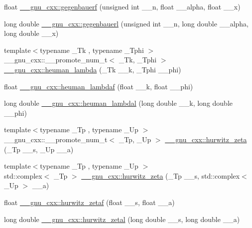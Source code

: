 \begin{DoxyCompactItemize}
\item 
float \hyperlink{group__gnu__math__spec__func_ga0f16dd9c771c8c177f377381b6e3387c}{\+\_\+\+\_\+gnu\+\_\+cxx\+::gegenbauerf} (unsigned int \+\_\+\+\_\+n, float \+\_\+\+\_\+alpha, float \+\_\+\+\_\+x)
\item 
long double \hyperlink{group__gnu__math__spec__func_gabf1644841deefbb162ade9fa508591cb}{\+\_\+\+\_\+gnu\+\_\+cxx\+::gegenbauerl} (unsigned int \+\_\+\+\_\+n, long double \+\_\+\+\_\+alpha, long double \+\_\+\+\_\+x)
\item 
{\footnotesize template$<$typename \+\_\+\+Tk , typename \+\_\+\+Tphi $>$ }\\\+\_\+\+\_\+gnu\+\_\+cxx\+::\+\_\+\+\_\+promote\+\_\+num\+\_\+t$<$ \+\_\+\+Tk, \+\_\+\+Tphi $>$ \hyperlink{group__gnu__math__spec__func_ga3b606d8617459ef7e5d340db1bae13ec}{\+\_\+\+\_\+gnu\+\_\+cxx\+::heuman\+\_\+lambda} (\+\_\+\+Tk \+\_\+\+\_\+k, \+\_\+\+Tphi \+\_\+\+\_\+phi)
\item 
float \hyperlink{group__gnu__math__spec__func_ga10cf5d54d985aa3a58cb197601040ac8}{\+\_\+\+\_\+gnu\+\_\+cxx\+::heuman\+\_\+lambdaf} (float \+\_\+\+\_\+k, float \+\_\+\+\_\+phi)
\item 
long double \hyperlink{group__gnu__math__spec__func_gadadaeb83b3d9c2fccd33ab8ec3188df5}{\+\_\+\+\_\+gnu\+\_\+cxx\+::heuman\+\_\+lambdal} (long double \+\_\+\+\_\+k, long double \+\_\+\+\_\+phi)
\item 
{\footnotesize template$<$typename \+\_\+\+Tp , typename \+\_\+\+Up $>$ }\\\+\_\+\+\_\+gnu\+\_\+cxx\+::\+\_\+\+\_\+promote\+\_\+num\+\_\+t$<$ \+\_\+\+Tp, \+\_\+\+Up $>$ \hyperlink{group__gnu__math__spec__func_gaed8e8bb0f1755fa7b0786d02ed574347}{\+\_\+\+\_\+gnu\+\_\+cxx\+::hurwitz\+\_\+zeta} (\+\_\+\+Tp \+\_\+\+\_\+s, \+\_\+\+Up \+\_\+\+\_\+a)
\item 
{\footnotesize template$<$typename \+\_\+\+Tp , typename \+\_\+\+Up $>$ }\\std\+::complex$<$ \+\_\+\+Tp $>$ \hyperlink{group__gnu__math__spec__func_gaa7f0d1fbba9d2ce07a30d907302d527f}{\+\_\+\+\_\+gnu\+\_\+cxx\+::hurwitz\+\_\+zeta} (\+\_\+\+Tp \+\_\+\+\_\+s, std\+::complex$<$ \+\_\+\+Up $>$ \+\_\+\+\_\+a)
\item 
float \hyperlink{group__gnu__math__spec__func_gaa745d7f2edde060ed2f22817ad89df1f}{\+\_\+\+\_\+gnu\+\_\+cxx\+::hurwitz\+\_\+zetaf} (float \+\_\+\+\_\+s, float \+\_\+\+\_\+a)
\item 
long double \hyperlink{group__gnu__math__spec__func_gad8f2cfc7e198755968bae35d46b49d5a}{\+\_\+\+\_\+gnu\+\_\+cxx\+::hurwitz\+\_\+zetal} (long double \+\_\+\+\_\+s, long double \+\_\+\+\_\+a)

\end{DoxyCompactItemize}
